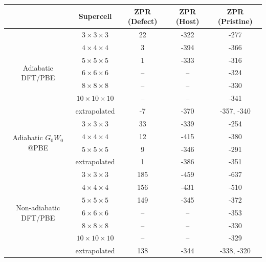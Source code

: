 \documentclass[journal=jctcce,manuscript=article]{achemso}
\begin{document}
\begin{table}[]
    \centering
    \begin{threeparttable}
    \begin{tabular}{ccccc}
    \hline\hline
    & Supercell            & ZPR (Defect) & ZPR (Host) & ZPR (Pristine) \\
    \hline
    \multirow{7}{*}{Adiabatic DFT/PBE} & $3\times 3\times 3$                 & 22   & -322                       & -277 \\
    & $4\times 4\times 4$                & 3  & -394                           & -366 \\
    & $5\times 5\times 5$                & 1   & -333                         & -316 \\
    & $6\times 6\times 6$ & --                  & -- & -324 \\
    & $8\times 8\times 8$ & --                  & -- & -330 \\
    & $10\times 10\times 10$ & --               & -- & -341 \\
    & extrapolated & -7\tnote{a} & -370\tnote{a} & -357\tnote{a}, -340\tnote{b} \\
    \hline
    \multirow{4}{*}{Adiabatic $G_0W_0$@PBE} & $3\times 3\times 3$                 & 33     & -339                      & -254 \\
    & $4\times 4\times 4$                 & 12   & -415                        & -380 \\
    & $5\times 5\times 5$               & 9    & -346                         & -291 \\
    & extrapolated & 1\tnote{a}  & -386\tnote{a} & -351\tnote{a} \\
    \hline
    \multirow{7}{*}{Non-adiabatic DFT/PBE} & $3\times 3\times 3$  &	185 &                 -459                          & -637\\
    & $4\times 4\times 4$ 	& 156 &  -431                          &  -510 \\
    & $5\times 5\times 5$ &	149 &  -345                           &  -372 \\
    & $6\times 6\times 6$ & --                  & -- & -353 \\
    & $8\times 8\times 8$ & --                  & -- & -330 \\
    & $10\times 10\times 10$ & --               & -- & -329 \\
    & extrapolated  & 138\tnote{a} & -344\tnote{a} & -338\tnote{a}, -320\tnote{b} \\

\end{tabular}
\end{threeparttable}
\end{table}
\end{document}
